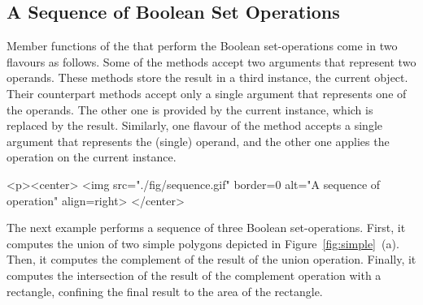 \subsection{A Sequence of Boolean Set Operations}
\label{bso_ssec:sequence}
Member functions of the  that perform the
Boolean set-operations come in two flavours as follows. Some of the 
methods accept two arguments that represent two operands. These methods 
store the result in a third instance, the current object. Their 
counterpart methods accept only a single argument that represents one of 
the operands. The other one is provided by the current instance, which is 
replaced by the result. Similarly, one flavour of the  
method accepts a single argument that represents the (single) operand, 
and the other one applies the operation on the current instance.

\lcTex{%
  \setlength{\widthRight}{2.3cm}
  \setlength{\widthLeft}{\widthLineReal}
  \addtolength{\widthLeft}{-\widthRight}
  \begin{minipage}{\widthLeft}
}
\label{fig:sequence}
\begin{ccHtmlOnly}
  <p><center>
    <img src="./fig/sequence.gif" border=0 alt="A sequence of operation" align=right>
  </center>
\end{ccHtmlOnly}
The next example performs a sequence of three Boolean set-operations.
First, it computes the union of two simple polygons depicted in
Figure~\ref{fig:simple}~(a). Then, it computes the complement of the result
of the union operation. Finally, it computes the intersection of the result
of the complement operation with a rectangle, confining the final result to 
the area of the rectangle.

